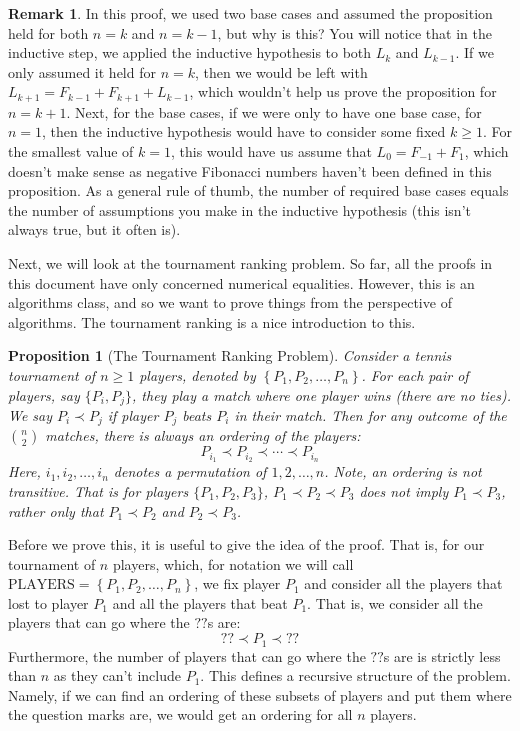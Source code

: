 \documentclass{article}
\theoremstyle{plain}
\newtheorem{prop}{Proposition}
\theoremstyle{definition}
\newtheorem{remark}{Remark}
\begin{document}
\begin{remark}
    In this proof, we used two base cases and assumed the proposition held for both \(n=k\) and \(n=k-1\), but why is this? You will notice that in the inductive step, we applied the inductive hypothesis to both \(L_k\) and \(L_{k-1}\). If we only assumed it held for \(n=k\), then we would be left with \(L_{k+1} = F_{k-1} + F_{k+1} + L_{k-1}\), which wouldn't help us prove the proposition for \(n=k+1\). Next, for the base cases, if we were only to have one base case, for \(n=1\), then the inductive hypothesis would have to consider some fixed \(k \geq 1\). For the smallest value of \(k=1\), this would have us assume that \(L_0 = F_{-1} + F_{1}\), which doesn't make sense as negative Fibonacci numbers haven't been defined in this proposition. As a general rule of thumb, the number of required base cases equals the number of assumptions you make in the inductive hypothesis (this isn't always true, but it often is).
\end{remark}

\phantom{abc}

Next, we will look at the tournament ranking problem. So far, all the proofs in this document have only concerned numerical equalities. However, this is an algorithms class, and so we want to prove things from the perspective of algorithms. The tournament ranking is a nice introduction to this.

\begin{prop}[The Tournament Ranking Problem]
    Consider a tennis tournament of \(n \geq 1\) players, denoted by \(\left\{P_1, P_2, \dotsc, P_n\right\}\). For each pair of players, say \(\{P_i, P_j\}\), they play a match where one player wins (there are no ties). We say \(P_i \prec P_j\) if player \(P_j\) beats \(P_i\) in their match. Then for any outcome of the \(\binom{n}{2}\) matches, there is always an ordering of the players:
    \[P_{i_1} \prec P_{i_2} \prec \cdots \prec P_{i_n}\]
    Here, \(i_1, i_2, \dotsc, i_n\) denotes a permutation of \(1, 2, \dotsc, n\). Note, an ordering is \emph{not} transitive. That is for players \(\{P_1, P_2, P_3\}\), \(P_1 \prec P_2 \prec P_3\) does \emph{not} imply \(P_1 \prec P_3\), rather only that \(P_1 \prec P_2\) and \(P_2 \prec P_3\).
\end{prop}

Before we prove this, it is useful to give the idea of the proof. That is, for our tournament of \(n\) players, which, for notation we will call \(\text{PLAYERS} = \left\{P_1, P_2, \dotsc, P_n\right\}\), we fix player \(P_1\) and consider all the players that lost to player \(P_1\) and all the players that beat \(P_1\). That is, we consider all the players that can go where the \(??\)s are:
\[?? \prec P_1 \prec ??\]
Furthermore, the number of players that can go where the \(??\)s are is strictly less than \(n\) as they can't include \(P_1\). This defines a recursive structure of the problem. Namely, if we can find an ordering of these subsets of players and put them where the question marks are, we would get an ordering for all \(n\) players.
\end{document}
